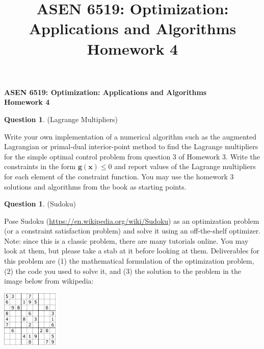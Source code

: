 \documentclass{article}
\title{ASEN 6519: Optimization: Applications and Algorithms\\
       Homework 4}
\theoremstyle{definition}
\newtheorem{question}[thm]{Question}
\begin{document}
\begin{center}
{\large \textbf{ASEN 6519: Optimization: Applications and Algorithms} \\ \textbf{Homework 4}}\\
\end{center}


\begin{question}(Lagrange Multipliers)

    Write your own implementation of a numerical algorithm such as the augmented Lagrangian or primal-dual interior-point method to find the Lagrange multipliers for the simple optimal control problem from question 3 of Homework 3. Write the constraints in the form $\mathbf{g}(\mathbf{x}) \leq 0$ and report values of the Lagrange multipliers for each element of the constraint function. You may use the homework 3 solutions and algorithms from the book as starting points.
\end{question}

\begin{question}(Sudoku)

    Pose Sudoku (\url{https://en.wikipedia.org/wiki/Sudoku}) as an optimization problem (or a constraint satisfaction problem) and solve it using an off-the-shelf optimizer. Note: since this is a classic problem, there are many tutorials online. You may look at them, but please take a stab at it before looking at them.
    Deliverables for this problem are (1) the mathematical formulation of the optimization problem, (2) the code you used to solve it, and (3) the solution to the problem in the image below from wikipedia:
    \begin{center}
        \includegraphics[width=0.2\textwidth]{sudoku.png}
    \end{center}
\end{question}
\end{document}
